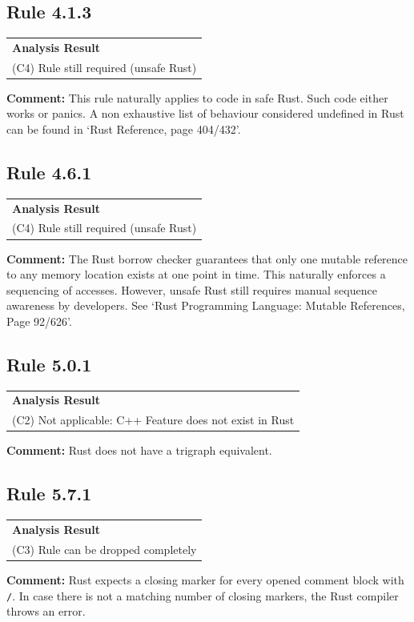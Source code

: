 \subsection*{Rule 4.1.3}
\begin{longtable}{p{13cm}}
\textbf{Analysis Result} \\
(C4) Rule still required (unsafe Rust) \\
\end{longtable}
\textbf{Comment:} This rule naturally applies to code in safe Rust. Such code either works or panics. A non exhaustive list of behaviour considered undefined in Rust can be found in `Rust Reference, page 404/432'. \\
\subsection*{Rule 4.6.1}
\begin{longtable}{p{13cm}}
\textbf{Analysis Result} \\
(C4) Rule still required (unsafe Rust) \\
\end{longtable}
\textbf{Comment:} The Rust borrow checker guarantees that only one mutable reference to any memory location exists at one point in time. This naturally enforces a sequencing of accesses. However, unsafe Rust still requires manual sequence awareness by developers. See `Rust Programming Language: Mutable References, Page 92/626'. \\
\subsection*{Rule 5.0.1}
\begin{longtable}{p{13cm}}
\textbf{Analysis Result} \\
(C2) Not applicable: C++ Feature does not exist in Rust \\
\end{longtable}
\textbf{Comment:} Rust does not have a trigraph equivalent. \\
\subsection*{Rule 5.7.1}
\begin{longtable}{p{13cm}}
\textbf{Analysis Result} \\
(C3) Rule can be dropped completely \\
\end{longtable}
\textbf{Comment:} Rust expects a closing marker for every opened comment block with \texttt{/\*}. In case there is not a matching number of closing markers, the Rust compiler throws an error. \\


